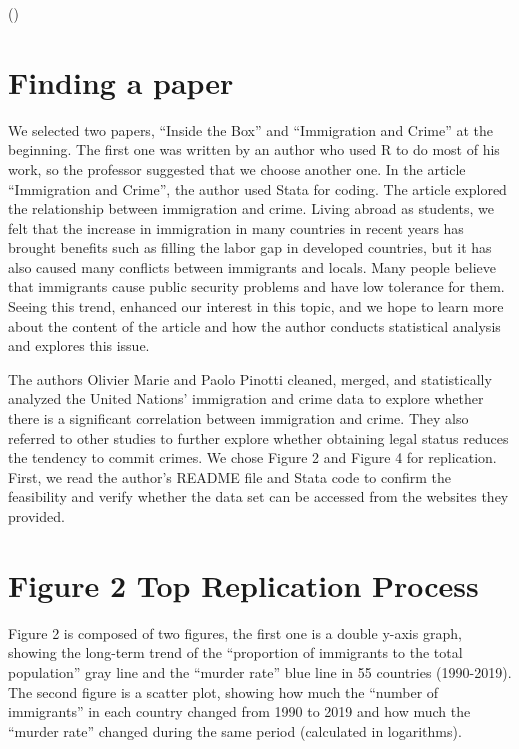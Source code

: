 \documentclass[
  man,
  floatsintext,
  longtable,
  nolmodern,
  notxfonts,
  notimes,
  colorlinks=true,linkcolor=blue,citecolor=blue,urlcolor=blue]{apa7}
\begin{document}
()

\section{Finding a paper}\label{finding-a-paper}

We selected two papers, ``Inside the Box'' and ``Immigration and Crime''
at the beginning. The first one was written by an author who used R to
do most of his work, so the professor suggested that we choose another
one. In the article ``Immigration and Crime'', the author used Stata for
coding. The article explored the relationship between immigration and
crime. Living abroad as students, we felt that the increase in
immigration in many countries in recent years has brought benefits such
as filling the labor gap in developed countries, but it has also caused
many conflicts between immigrants and locals. Many people believe that
immigrants cause public security problems and have low tolerance for
them. Seeing this trend, enhanced our interest in this topic, and we
hope to learn more about the content of the article and how the author
conducts statistical analysis and explores this issue.

The authors Olivier Marie and Paolo Pinotti cleaned, merged, and
statistically analyzed the United Nations' immigration and crime data to
explore whether there is a significant correlation between immigration
and crime. They also referred to other studies to further explore
whether obtaining legal status reduces the tendency to commit crimes. We
chose Figure 2 and Figure 4 for replication. First, we read the author's
README file and Stata code to confirm the feasibility and verify whether
the data set can be accessed from the websites they provided.

\section{Figure 2 Top Replication
Process}\label{figure-2-top-replication-process}

Figure 2 is composed of two figures, the first one is a double y-axis
graph, showing the long-term trend of the ``proportion of immigrants to
the total population'' gray line and the ``murder rate'' blue line in 55
countries (1990-2019). The second figure is a scatter plot, showing how
much the ``number of immigrants'' in each country changed from 1990 to
2019 and how much the ``murder rate'' changed during the same period
(calculated in logarithms).
\end{document}
